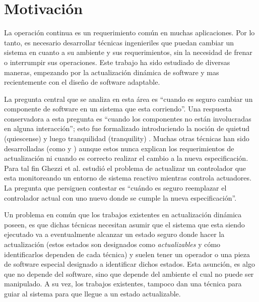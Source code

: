 \section{Motivación}

La operación continua es un requerimiento común en muchas aplicaciones. Por lo tanto, es necesario desarrollar técnicas
ingenieriles que puedan cambiar un sistema en cuanto a su ambiente y sus requerimientos, sin la necesidad de frenar o
interrumpir sus operaciones. Este trabajo ha sido estudiado de diversas maneras, empezando por la actualización dinámica
de software \cite{60317} y mas recientemente con el diseño de software adaptable. \cite{SEAMS}

La pregunta central que se analiza en esta área es ``cuando es seguro cambiar un componente de software en un sistema
que esta corriendo''. Una respuesta conservadora a esta pregunta es ``cuando los componentes no están involucradas en
alguna interacción''; esto fue formalizado introduciendo la noción de quietud (quiescense) \cite{60317} y luego
tranquilidad (tranquility) \cite{4359466}. Muchas otras técnicas han sido desarrolladas (como
\cite{Anderson:2009:MPM:1656437.1656448} y \cite{485222}) aunque estos nunca explican los requerimientos de
actualización \cite{Baresi:2010:DBD:1882362.1882367} ni cuando es correcto realizar el cambio a la nueva especificación.
Para tal fin Ghezzi et al. \cite{6224401,PanzicaLaManna:2013:FCC:2487336.2487349} estudió el problema de actualizar un
controlador que esta monitoreando un entorno de sistema reactivo mientras controla actuadores. La pregunta que persiguen
contestar es ``cuándo es seguro reemplazar el controlador actual con uno nuevo donde se cumple la nueva
especificación''.

Un problema en común que los trabajos existentes en actualización dinámica poseen, es que dichas técnicas necesitan
asumir que el sistema que esta siendo ejecutado va a eventualmente alcanzar un estado seguro donde hacer la
actualización (estos estados son designados como \emph{actualizables} y cómo identificarlos dependen de cada técnica) y
suelen tener un operador o una pieza de software especial designado a identificar dichos estados. Esta asunción, es algo
que no depende del software, sino que depende del ambiente el cual no puede ser manipulado. A su vez, los trabajos
existentes, tampoco dan una técnica para guiar al sistema para que llegue a un estado actualizable. 


